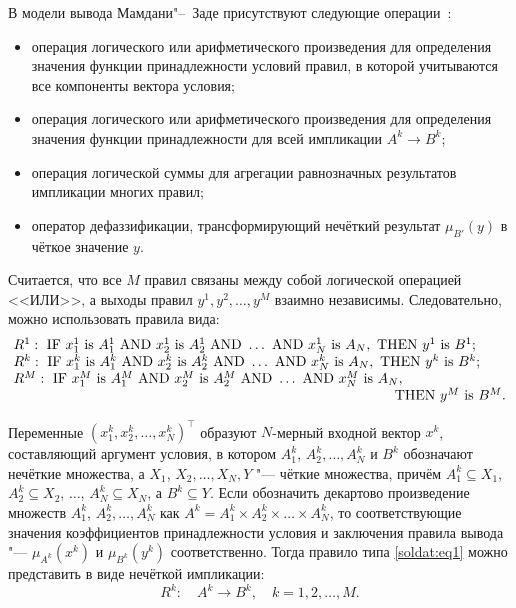 В модели вывода Мамдани"--~Заде присутствуют следующие операции~\cite{soldat:bib1}:
\begin{itemize}
\item операция логического или арифметического произведения для определения значения функции принадлежности условий правил, в которой учитываются все компоненты вектора условия;
\item операция логического или арифметического произведения для определения значения функции принадлежности для всей импликации ${A^k {\to} B^k}$;
\item операция логической суммы для агрегации равнозначных результатов импликации многих правил;
\item оператор дефаззификации, трансформирующий нечёткий результат \linebreak $\mu _{B'} (y)$ в чёткое значение $y$.
\end{itemize}

Считается, что все $M$ правил связаны между собой логической операцией
<<ИЛИ>>, а выходы правил $y^1, y^2,\ldots,y^M$ взаимно независимы.
Следовательно, можно использовать правила вида:
\begin{equation}
\label{soldat:eq1}
\!\!
\begin{array}{l}
R^1 : \text{ IF }  x_1^1  \text{ is } A_1^1   \text{ AND } x_2^1 \text{ is }  A_2^1 \text{ AND } \dots  \text{ AND }
 x_N^1  \text{ is }  A_N , \text{ THEN } y^1  \text{ is } B^1;\\
R^k :  \text{ IF }   x_1^k   \text{ is } A_1^k   \text{ AND }  x_2^k   \text{ is } A_2^k
  \text{ AND } \dots   \text{ AND }  x_N^k   \text{ is } A_N , \text{ THEN } y^k \text{ is } B^k;\\
R^M :  \text{ IF }  x_1^M  \text{ is } A_1^M  \text{ AND }  x_2^M  \text{ is } A_2^M
 \text{ AND } \dots  \text{ AND }  x_N^M   \text{ is } A_N , \\
\hspace{9.5cm} 
  \text{ THEN } y^M \text{ is } B^M.
\end{array}\!\!
\end{equation}

Переменные $(x_1^k ,x_2^k ,\ldots,x_N^k )^\top$ образуют $N$-мерный входной вектор $x^k$, составляющий аргумент условия, в котором $A_1^k$, $A_2^k,\ldots,A_N^k$ и $B^k$ обозначают нечёткие множества, а $X_1$, $X_2,\ldots,X_N,Y$ "--- чёткие
множества, причём $A_1^k \subseteq X_1$, $A_2^k \subseteq X_2$, $\ldots$, $A_N^k \subseteq X_N $, а $B^k\subseteq Y$. 
Если обозначить декартово произведение
множеств $A_1^k$, $A_2^k ,\ldots,A_N^k$ как $A^k=A_1^k \times A_2^k
\times \ldots \times A_N^k$, то соответствующие значения коэффициентов
принадлежности условия и заключения правила вывода "--- $\mu_{A^k} (x^k)$ и $\mu_{B^k} (y^k)$ соответственно. 
Тогда правило типа \eqref{soldat:eq1} можно представить в виде нечёткой импликации:
\begin{equation}
\label{soldat:eq2}
R^k: \quad A^k\to B^k,\quad k=1, 2, \ldots,M.
\end{equation}

